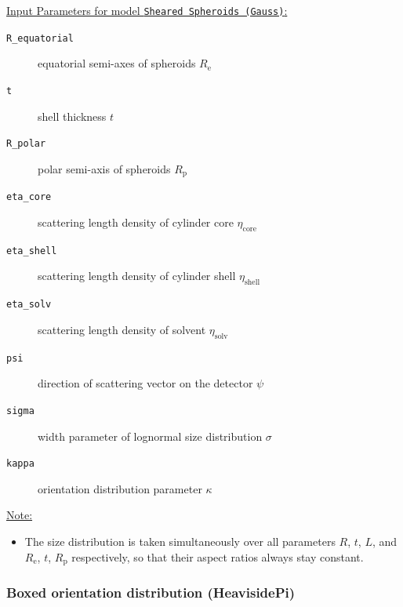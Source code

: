 \vspace{5mm}

\uline{Input Parameters for model \texttt{Sheared Spheroids (Gauss)}:}\\
\begin{description}
\item[\texttt{R\_equatorial}] equatorial semi-axes of spheroids $R_\mathrm{e}$
\item[\texttt{t}] shell thickness $t$
\item[\texttt{R\_polar}] polar semi-axis of spheroids $R_\mathrm{p}$
\item[\texttt{eta\_core}] scattering length density of cylinder core $\eta_\mathrm{core}$
\item[\texttt{eta\_shell}] scattering length density of cylinder shell $\eta_\mathrm{shell}$
\item[\texttt{eta\_solv}] scattering length density of solvent $\eta_\mathrm{solv}$
\item[\texttt{psi}] direction of scattering vector on the detector $\psi$
\item[{\texttt{sigma}}] width parameter of lognormal size distribution $\sigma$
\item[{\texttt{kappa}}] orientation distribution parameter $\kappa$
\end{description}

\vspace{5mm}

\uline{Note:}
\begin{itemize}
\item The size distribution is taken simultaneously over all parameters $R$, $t$, $L$, and $R_\mathrm{e}$, $t$, $R_\mathrm{p}$ respectively, so that their aspect ratios always stay constant.
\end{itemize}


\newpage
\subsubsection{Boxed orientation distribution (HeavisidePi)} ~\\

